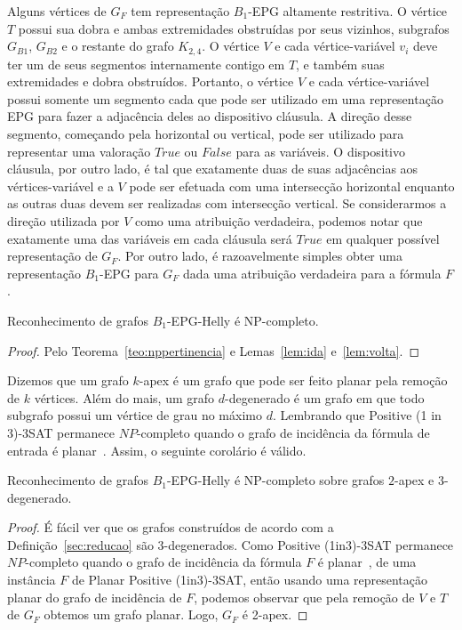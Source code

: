 \smallskip

Alguns vértices de  $G_F$ tem representação $B_1$-EPG altamente restritiva. O vértice $T$ possui sua dobra e ambas extremidades obstruídas por seus vizinhos, subgrafos $G_{B1}$, $G_{B2}$ e o restante do grafo $K_{2,4}$. O vértice $V$ e cada  vértice-variável $v_i$ deve ter um de seus segmentos internamente contigo em  $T$, e também suas extremidades e dobra obstruídos.  Portanto, o vértice $V$ e cada 
vértice-variável possui somente um segmento cada que pode ser utilizado em uma representação EPG para fazer a adjacência deles ao dispositivo cláusula. A direção desse segmento, começando pela horizontal ou vertical, pode ser utilizado para representar uma valoração $True$ ou $False$ para as variáveis. O  dispositivo cláusula, por outro lado, é tal que exatamente duas de suas adjacências aos vértices-variável e a $V$ pode ser efetuada com uma intersecção horizontal enquanto as outras duas  devem ser realizadas com intersecção vertical. Se considerarmos a direção utilizada por  $V$ como uma atribuição verdadeira, podemos notar que exatamente uma das variáveis em cada cláusula será $True$ em qualquer possível representação de  $G_F$. Por outro lado, é razoavelmente simples obter uma representação $B_1$-EPG para $G_F$ dada uma atribuição verdadeira para a fórmula $F$.


\begin{theorem}
{\sc Reconhecimento de grafos $B_{1}$-EPG-Helly } é NP-completo.
\end{theorem}
\begin{proof}
Pelo Teorema~\ref{teo:nppertinencia} e Lemas~\ref{lem:ida} e~\ref{lem:volta}.
 \end{proof} %

Dizemos que um grafo $k$-apex é um grafo que pode ser feito planar pela remoção de $k$ vértices. Além do mais, um grafo $d$-degenerado é um grafo em que todo subgrafo possui um vértice de grau no máximo $d$. Lembrando que  {\sc Positive (1 in 3)-3SAT} permanece $NP$-completo quando o grafo de incidência da fórmula de entrada é planar~\cite{mulzer2008minimum}. Assim, o seguinte corolário é válido.

\begin{corollary}
 \label{coro:2apexAnd3degenerate}
{\sc Reconhecimento de grafos $B_{1}$-EPG-Helly} é NP-completo sobre grafos $2$-apex e $3$-degenerado.
\end{corollary}

\begin{proof}
É fácil ver que os grafos construídos de acordo com a Definição~\ref{sec:reducao} são $3$-degenerados.
Como {\sc Positive (1in3)-3SAT} permanece $NP$-completo quando o grafo de incidência da fórmula  $F$ é planar~\cite{mulzer2008minimum},  de uma instância $F$ de {\sc Planar Positive (1in3)-3SAT}, então usando uma representação planar do grafo de incidência de $F$, podemos observar que pela remoção de $V$ e $T$ de $G_F$ obtemos um grafo planar. Logo, $G_F$ é 2-apex. 
\end{proof}


